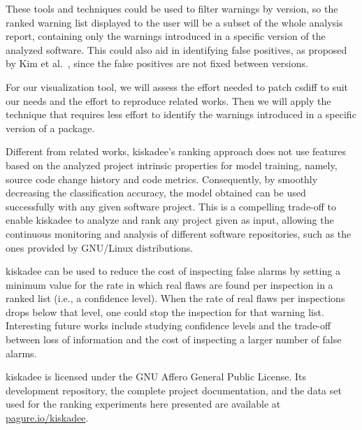 These tools and techniques could be used to filter warnings by version, so the
ranked warning list displayed to the user will be a subset of the whole
analysis report, containing only the warnings introduced in a specific version
of the analyzed software. This could also aid in identifying false positives,
as proposed by Kim et al.~\cite{kim_which_2007}, since the false positives are
not fixed between versions.

For our visualization tool, we will assess the effort needed to patch csdiff
to suit our needs and the effort to reproduce related works. Then we will
apply the technique that requires less effort to identify the warnings introduced
in a specific version of a package.



Different from related works, kiskadee's ranking approach does not use
features based on the analyzed project intrinsic properties for model training,
namely, source code change history and code metrics. Consequently, by
smoothly decreasing the classification accuracy, the model obtained can be used
successfully with any given software project. This is a compelling trade-off
to enable kiskadee to analyze and rank any project given as input, allowing the
continuous monitoring and analysis of different software repositories, such as
the ones provided by GNU/Linux distributions.

kiskadee can be used to reduce the cost of inspecting false alarms by setting a
minimum value for the rate in which real flaws are found per inspection in a
ranked list (i.e., a confidence level). When the rate of real flaws per
inspections drops below that level, one could stop the inspection for that
warning list. Interesting future works include studying confidence levels and
the trade-off between loss of information and the cost of inspecting a larger
number of false alarms.

kiskadee is licensed under the GNU Affero General Public License. Its
development repository, the complete project documentation, and the data set
used for the ranking experiments here presented are available at
\url{pagure.io/kiskadee}.
